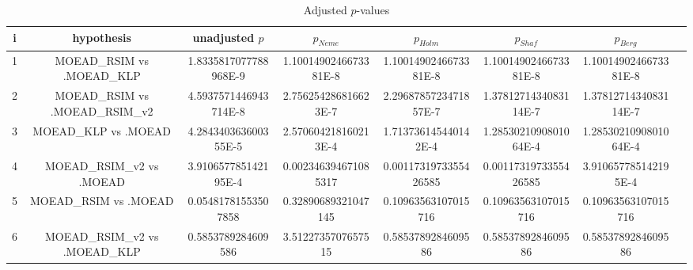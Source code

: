 \documentclass[a4paper,10pt]{article}
\begin{document}
\begin{landscape}
\begin{table}[!htp]
\centering\tiny
\caption{Adjusted $p$-values}
\begin{tabular}{cccccccc}
i&hypothesis&unadjusted $p$&$p_{Neme}$&$p_{Holm}$&$p_{Shaf}$&$p_{Berg}$\\
\hline
1&MOEAD_RSIM vs .MOEAD_KLP&1.8335817077788968E-9&1.1001490246673381E-8&1.1001490246673381E-8&1.1001490246673381E-8&1.1001490246673381E-8\\
2&MOEAD_RSIM vs .MOEAD_RSIM_v2&4.5937571446943714E-8&2.756254286816623E-7&2.2968785723471857E-7&1.3781271434083114E-7&1.3781271434083114E-7\\
3&MOEAD_KLP vs .MOEAD&4.284340363600355E-5&2.570604218160213E-4&1.713736145440142E-4&1.2853021090801064E-4&1.2853021090801064E-4\\
4&MOEAD_RSIM_v2 vs .MOEAD&3.910657785142195E-4&0.002346394671085317&0.0011731973355426585&0.0011731973355426585&3.910657785142195E-4\\
5&MOEAD_RSIM vs .MOEAD&0.05481781553507858&0.32890689321047145&0.10963563107015716&0.10963563107015716&0.10963563107015716\\
6&MOEAD_RSIM_v2 vs .MOEAD_KLP&0.5853789284609586&3.5122735707657515&0.5853789284609586&0.5853789284609586&0.5853789284609586\\
\hline
\end{tabular}
\end{table}

\end{landscape}
\end{document}

